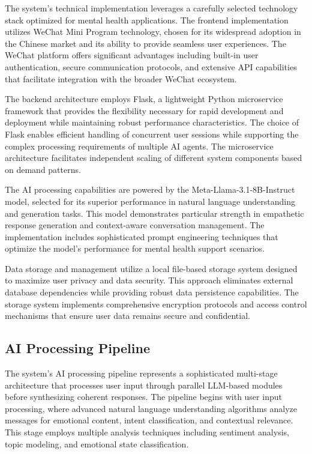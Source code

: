 The system's technical implementation leverages a carefully selected technology stack optimized for mental health applications. The frontend implementation utilizes WeChat Mini Program technology, chosen for its widespread adoption in the Chinese market and its ability to provide seamless user experiences. The WeChat platform offers significant advantages including built-in user authentication, secure communication protocols, and extensive API capabilities that facilitate integration with the broader WeChat ecosystem.

The backend architecture employs Flask, a lightweight Python microservice framework that provides the flexibility necessary for rapid development and deployment while maintaining robust performance characteristics. The choice of Flask enables efficient handling of concurrent user sessions while supporting the complex processing requirements of multiple AI agents. The microservice architecture facilitates independent scaling of different system components based on demand patterns.

The AI processing capabilities are powered by the Meta-Llama-3.1-8B-Instruct model, selected for its superior performance in natural language understanding and generation tasks. This model demonstrates particular strength in empathetic response generation and context-aware conversation management. The implementation includes sophisticated prompt engineering techniques that optimize the model's performance for mental health support scenarios.

Data storage and management utilize a local file-based storage system designed to maximize user privacy and data security. This approach eliminates external database dependencies while providing robust data persistence capabilities. The storage system implements comprehensive encryption protocols and access control mechanisms that ensure user data remains secure and confidential.

\subsection{AI Processing Pipeline}

The system's AI processing pipeline represents a sophisticated multi-stage architecture that processes user input through parallel LLM-based modules before synthesizing coherent responses. The pipeline begins with user input processing, where advanced natural language understanding algorithms analyze messages for emotional content, intent classification, and contextual relevance. This stage employs multiple analysis techniques including sentiment analysis, topic modeling, and emotional state classification.


